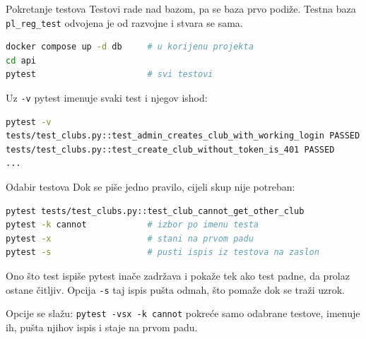 \begin{frame}[fragile]{Pokretanje testova}
Testovi rade nad bazom, pa se baza prvo podiže. Testna baza \texttt{pl\_reg\_test} odvojena je od razvojne i stvara se sama.

\begin{lstlisting}[language=bash]
docker compose up -d db     # u korijenu projekta
cd api
pytest                      # svi testovi
\end{lstlisting}

\vspace{0.6em}
Uz \texttt{-v} pytest imenuje svaki test i njegov ishod:

\begin{lstlisting}[language=bash]
pytest -v
tests/test_clubs.py::test_admin_creates_club_with_working_login PASSED
tests/test_clubs.py::test_create_club_without_token_is_401 PASSED
...
\end{lstlisting}
\end{frame}

\begin{frame}[fragile]{Odabir testova}
Dok se piše jedno pravilo, cijeli skup nije potreban:

\begin{lstlisting}[language=bash]
pytest tests/test_clubs.py::test_club_cannot_get_other_club
pytest -k cannot            # izbor po imenu testa
pytest -x                   # stani na prvom padu
pytest -s                   # pusti ispis iz testova na zaslon
\end{lstlisting}

\vspace{0.9em}
Ono što test ispiše pytest inače zadržava i pokaže tek ako test padne, da prolaz ostane čitljiv. Opcija \texttt{-s} taj ispis pušta odmah, što pomaže dok se traži uzrok.

\vspace{0.9em}
Opcije se slažu: \texttt{pytest -vsx -k cannot} pokreće samo odabrane testove, imenuje ih, pušta njihov ispis i staje na prvom padu.
\end{frame}

